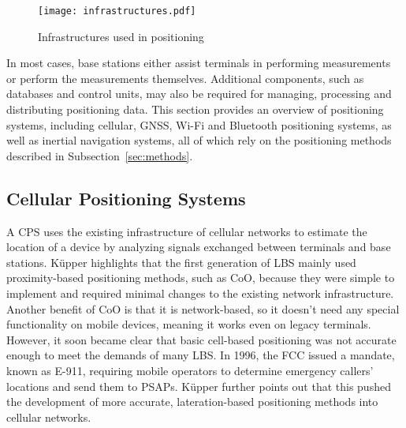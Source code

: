 \begin{figure}[htbp] 
    \centering 
    \texttt{[image: infrastructures.pdf]} 
    \caption{Infrastructures used in positioning \cite{kupper2005location}} 
    \label{fig:infrastructures} 
\end{figure}

In most cases, base stations either assist terminals in performing measurements or perform the measurements themselves. 
Additional components, such as databases and control units, may also be required for managing, processing and distributing positioning data. 
This section provides an overview of positioning systems, including cellular, \acs{GNSS}, \ac{Wi-Fi} and Bluetooth positioning systems, as well as inertial navigation systems, all of which rely on the positioning methods described in Subsection~\ref{sec:methods}.



\subsection{Cellular Positioning Systems}
A \ac{CPS} uses the existing infrastructure of cellular networks to estimate the location of a device by analyzing signals exchanged between terminals and base stations.
K\"upper \cite{kupper2005location} highlights that the first generation of \ac{LBS} mainly used proximity-based positioning methods, such as \acs{CoO}, because they were simple to implement and required minimal changes to the existing network infrastructure.
Another benefit of \acs{CoO} is that it is network-based, so it doesn't need any special functionality on mobile devices, meaning it works even on legacy terminals.
However, it soon became clear that basic cell-based positioning was not accurate enough to meet the demands of many \acs{LBS}.
In 1996, the \ac{FCC} issued a mandate, known as \ac{E-911}, requiring mobile operators to determine emergency callers' locations and send them to \ac{PSAPs}.
K\"upper \cite{kupper2005location} further points out that this pushed the development of more accurate, lateration-based positioning methods into cellular networks.

